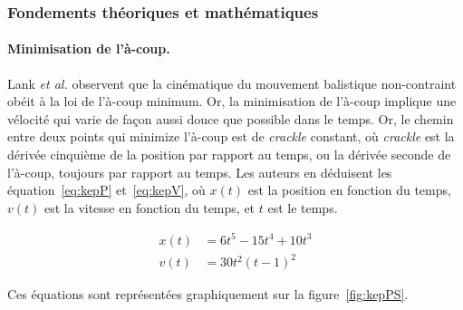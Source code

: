 	
	\subsubsection{Fondements théoriques et mathématiques}
	\paragraph{Minimisation de l'à-coup.}
	Lank \emph{et al.} observent que la cinématique du mouvement balistique non-contraint obéit à la loi de l'à-coup minimum. Or, la minimisation de l'à-coup implique une vélocité qui varie de façon aussi \og douce \fg{} que possible dans le temps. Or, le chemin entre deux points qui minimize l'à-coup est de \emph{crackle} constant, où \emph{crackle} est la dérivée cinquième de la position par rapport au temps, ou la dérivée seconde de l'à-coup, toujours par rapport au temps. Les auteurs en déduisent les équation~\ref{eq:kepP} et~\ref{eq:kepV}, où $x(t)$ est la position en fonction du temps, $v(t)$ est la vitesse en fonction du temps, et $t$ est le temps.
	
	\begin{align}
		\label{eq:kepP}
		x(t) &= 6t^{5} - 15t^{4} + 10t^{3} \\
		\label{eq:kepV}
		v(t) &= 30t^{2}(t - 1)^{2}
	\end{align}
	
	Ces équations sont représentées graphiquement sur la figure~\ref{fig:kepPS}.
	
